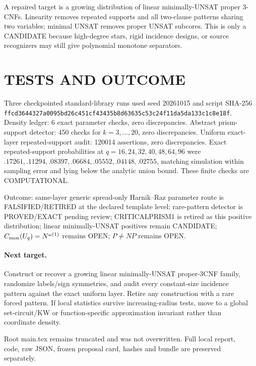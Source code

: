 \documentclass[11pt]{article}
\begin{document}
A repaired target is a growing distribution of linear minimally-UNSAT proper 3-CNFs. Linearity removes repeated supports and all two-clause patterns sharing two variables; minimal UNSAT removes proper UNSAT subcores. This is only a CANDIDATE because high-degree stars, rigid incidence designs, or source recognizers may still give polynomial monotone separators.

\section{TESTS AND OUTCOME}
Three checkpointed standard-library runs used seed 20261015 and script SHA-256 \texttt{ffcd3644327a0095bd26c451cf43435b8d63635c53c24f11da5da133c1c8e18f}. Density ledger: 6 exact parameter checks, zero discrepancies. Abstract prism-support detector: 450 checks for $k=3,\ldots,20$, zero discrepancies. Uniform exact-layer repeated-support audit: 120014 assertions, zero discrepancies. Exact repeated-support probabilities at $q=16,24,32,40,48,64,96$ were $.17261,.11294,.08397,.06684,.05552,.04148,.02755$, matching simulation within sampling error and lying below the analytic union bound. These finite checks are COMPUTATIONAL.

Outcome: same-layer generic spread-only Harnik--Raz parameter route is FALSIFIED/RETIRED at the declared template level; rare-pattern detector is PROVED/EXACT pending review; CRITICALPRISM1 is retired as this positive distribution; linear minimally-UNSAT positives remain CANDIDATE; $C_{\rm mon}(U_q)=N^{\omega(1)}$ remains OPEN; $P\ne NP$ remains OPEN.

\paragraph{Next target.} Construct or recover a growing linear minimally-UNSAT proper-3CNF family, randomize labels/sign symmetries, and audit every constant-size incidence pattern against the exact uniform layer. Retire any construction with a rare forced pattern. If local statistics survive increasing-radius tests, move to a global set-circuit/KW or function-specific approximation invariant rather than coordinate density.

Root main.tex remains truncated and was not overwritten. Full local report, code, raw JSON, frozen proposal card, hashes and bundle are preserved separately.
\end{document}

